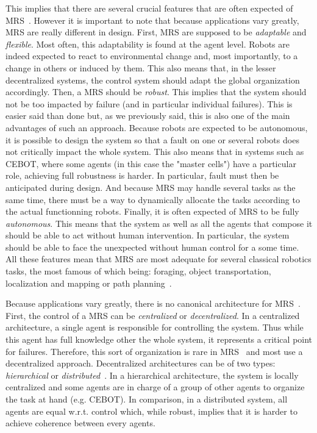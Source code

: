     This implies that there are several crucial features that are often expected of MRS~\parencite{Parker1994}. However it is important to note that because applications vary greatly, MRS are really different in design. First, MRS are supposed to be \emph{adaptable} and \emph{flexible}. Most often, this adaptability is found at the agent level. Robots are indeed expected to react to environmental change and, most importantly, to a change in others or induced by them. This also means that, in the lesser decentralized systems, the control system should adapt the global organization accordingly. Then, a MRS should be \emph{robust}. This implies that the system should not be too impacted by failure (and in particular individual failures). This is easier said than done but, as we previously said, this is also one of the main advantages of such an approach. Because robots are expected to be autonomous, it is possible to design the system so that a fault on one or several robots does not critically impact the whole system. This also means that in systems such as CEBOT, where some agents (in this case the "master cells") have a particular role, achieving full robustness is harder. In particular, fault must then be anticipated during design. And because MRS may handle several tasks as the same time, there must be a way to dynamically allocate the tasks according to the actual functionning robots. Finally, it is often expected of MRS to be fully \emph{autonomous}. This means that the system as well as all the agents that compose it should be able to act without human intervention. In particular, the system should be able to face the unexpected without human control for a some time. All these features mean that MRS are most adequate for several classical robotics tasks, the most famous of which being: foraging, object transportation, localization and mapping or path planning~\parencite{Farinelli2004}.

    Because applications vary greatly, there is no canonical architecture for MRS~\parencite{Cao1997, Parker2008}. First, the control of a MRS can be \emph{centralized} or \emph{decentralized}. In a centralized architecture, a single agent is responsible for controlling the system. Thus while this agent has full knowledge other the whole system, it represents a critical point for failures. Therefore, this sort of organization is rare in MRS~\parencite{Parker2008} and most use a decentralized approach. Decentralized architectures can be of two types: \emph{hierarchical} or \emph{distributed}~\parencite{Cao1997}. In a hierarchical architecture, the system is locally centralized and some agents are in charge of a group of other agents to organize the task at hand (e.g. CEBOT). In comparison, in a distributed system, all agents are equal w.r.t. control which, while robust, implies that it is harder to achieve coherence between every agents.

